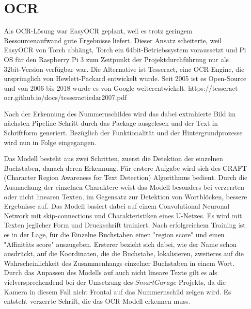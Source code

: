 
\section{OCR}

Als OCR-Lösung war EasyOCR geplant, weil es trotz geringem Ressourcenaufwand gute Ergebnisse liefert. Dieser Ansatz scheiterte, weil EasyOCR von Torch abhängt, Torch ein 64bit-Betriebssystem voraussetzt und Pi OS für den Raspberry Pi 3 zum Zeitpunkt der Projektdurchführung nur als 32bit-Version verfügbar war.
Die Alternative ist Tesseract, eine OCR-Engine, die ursprünglich von Hewlett-Packard entwickelt wurde. Seit 2005 ist es Open-Source und von 2006 bis 2018 wurde es von Google weiterentwickelt. https://tesseract-ocr.github.io/docs/tesseracticdar2007.pdf %

Nach der Erkennung des Nummernschildes wird das dabei extrahierte Bild im nächsten Pipeline Schritt durch das Package ausgelesen und der Text in Schriftform generiert. Bezüglich der Funktionalität und der Hintergrundprozesse wird nun in Folge eingegangen.

Das Modell besteht aus zwei Schritten, zuerst die Detektion der einzelnen Buchstaben, danach deren Erkennung. Für erstere Aufgabe wird sich des CRAFT (Character Region Awareness for Text Detection) Algorithmus bedient. \autocite[Vgl.][]{baek2019character} Durch die Ausmachung der einzelnen Charaktere weist das Modell besonders bei verzerrten oder nicht linearen Texten, im Gegensatz zur Detektion von Wortblöcken, bessere Ergebnisse auf. Das Modell basiert dabei auf einem  Convolutional Neuronal Network mit skip-connections und Charakteristiken eines U-Netzes. Es wird mit Texten jeglicher Form und Druckschrift trainiert. Nach erfolgreichem Training ist es in der Lage, für die Einzelne Buchstaben einen "region score" und einen "Affinitäts score" auszugeben. Ersterer bezieht sich dabei, wie der Name schon ausdrückt, auf die Koordinaten, die die Buchstabe, lokalisieren, zweiteres auf die Wahrscheinlichkeit des Zusammenhangs einzelner Buchstaben in einem Wort. Durch das Anpassen des Modells auf auch nicht lineare Texte gilt es als vielversprechendend bei der Umsetzung des $SmartGarage$ Projekts, da die Kamera in diesem Fall nicht Frontal auf das Nummernschild zeigen wird. Es entsteht verzerrte Schrift, die das OCR-Modell erkennen muss.



